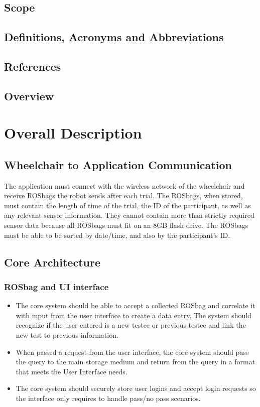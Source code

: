 \documentclass[onecolumn, draftclsnofoot,10pt, compsoc]{IEEEtran}
\begin{document}
\subsection{Scope}
\subsection{Definitions, Acronyms and Abbreviations}
\subsection{References}
\subsection{Overview}
\section{Overall Description}
\subsection{Wheelchair to Application Communication}
The application must connect with the wireless network of the wheelchair and receive ROSbags the robot sends after each trial.
The ROSbags, when stored, must contain the length of time of the trial, the ID of the participant, as well as any relevant sensor information.
They cannot contain more than strictly required sensor data because all ROSbags must fit on an 8GB flash drive.
The ROSbags must be able to be sorted by date/time, and also by the participant's ID.
\subsection{Core Architecture}
\subsubsection{ROSbag and UI interface}
\begin{itemize}
	\item The core system should be able to accept a collected ROSbag and correlate it with input from the user interface to create a data entry.
	\subitem The system should recognize if the user entered is a new testee or previous testee and link the new test to previous information.
	\item When passed a request from the user interface, the core system should pass the query to the main storage medium and return from the query in a format that meets the User Interface needs.
	\item The core system should securely store user logins and accept login requests so the interface only requires to handle pass/no pass scenarios.
\end{itemize}
\end{document}
